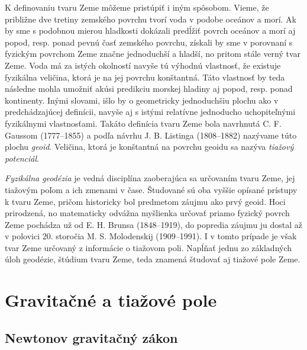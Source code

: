 \documentclass[a4paper, 12pt]{book}
\begin{document}
K definovaniu tvaru Zeme môžeme pristúpiť i iným spôsobom.  Vieme, že približne 
dve tretiny zemského povrchu tvorí voda v podobe oceánov a morí.  Ak by sme 
s podobnou mierou hladkosti dokázali predĺžiť povrch oceánov a morí aj popod, 
resp. ponad pevnú časť zemského povrchu, získali by sme v porovnaní s fyzickým 
povrchom Zeme značne jednoduchší a hladší, no pritom stále verný tvar Zeme.  
Voda má za istých okolností navyše tú výhodnú vlastnosť, že existuje fyzikálna 
veličina, ktorá je na jej povrchu konštantná.  Táto vlastnosť by teda následne 
mohla umožniť akúsi predikciu morskej hladiny aj popod, resp. ponad kontinenty.  
Inými slovami, išlo by o geometricky jednoduchšiu plochu ako v predchádzajúcej 
definícii, navyše aj s istými relatívne jednoducho uchopiteľnými fyzikálnymi 
vlastnosťami.  Takáto definícia tvaru Zeme bola navrhnutá C. F. Gaussom 
(1777--1855) a podľa návrhu J. B. Listinga (1808--1882) nazývame túto plochu 
\emph{geoid}.  Veličina, ktorá je konštantná na povrchu geoidu sa nazýva 
\emph{tiažový potenciál}.

\emph{Fyzikálna geodézia} je vedná disciplína zaoberajúca sa určovaním tvaru 
Zeme, jej tiažovým poľom a ich zmenami v čase.  Študované sú oba vyššie opísané 
prístupy k tvaru Zeme, pričom historicky bol predmetom záujmu ako prvý geoid.  
Hoci prirodzená, no matematicky odvážna myšlienka určovať priamo fyzický povrch 
Zeme pochádza už od E. H. Brunsa (1848--1919), do popredia záujmu ju dostal až 
v polovici 20. storočia M. S. Molodenskij (1909--1991).  I v tomto prípade je 
však tvar Zeme určovaný z informácie o tiažovom poli.  Napĺňať jednu zo 
základných úloh geodézie, štúdium tvaru Zeme, teda znamená študovať aj tiažové 
pole Zeme.







\chapter{Gravitačné a tiažové pole}
\label{sec:gravitational_and_gravity_field}






\section{Newtonov gravitačný zákon}
\label{sec:newton_law}
\end{document}
